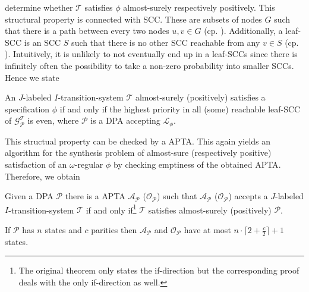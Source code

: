 determine whether $\mathcal{T}$ satisfies $\phi$ almost-surely respectively
positively. This structural property is connected with \ac{SCC}. These are
subsets of nodes $G$ such that there is a path between every two nodes
$u,v\in G$ (cp. \cite{Tarjan}). Additionally, a leaf-\ac{SCC} is an \ac{SCC}
$S$ such that there is no other \ac{SCC} reachable from any $v\in S$ (cp.
\cite[Bottom-\ac{SCC}]{ComplexProbVerification}). Intuitively, it is unlikely
to not eventually end up in a leaf-\acp{SCC} since there is infinitely often
the possibility to take a non-zero probability into smaller \acp{SCC}. Hence we
state
\begin{lemma}
  \cite[Lemma 1]{SynProbEnv}
  An $J$-labeled $I$-transition-system $\mathcal{T}$ almost-surely (positively)
  satisfies a specification $\phi$ if and only if the highest priority in all
  (some) reachable leaf-\ac{SCC} of $\mathcal{G}_{\mathcal{P}}^{\mathcal{T}}$
  is even, where $\mathcal{P}$ is a \ac{DPA} accepting $\mathcal{L}_{\phi}$.
  \label{lem:structuralprobability}
\end{lemma}
This structual property can be checked by a \ac{APTA}. This again yields an
algorithm for the synthesis problem of almost-sure (respectively positive)
satisfaction of an $\omega$-regular $\phi$ by checking emptiness of the
obtained \ac{APTA}. Therefore, we obtain
\begin{theorem}
  \cite[Theorem 1]{SynProbEnv}
  Given a \ac{DPA} $\mathcal{P}$ there is a \ac{APTA} 
  $\mathcal{A}_{\mathcal{P}}$ ($\mathcal{O}_{\mathcal{P}}$) such that 
  $\mathcal{A}_{\mathcal{P}}$ ($\mathcal{O}_{\mathcal{P}}$) accepts a 
  $J$-labeled $I$-transition-system $\mathcal{T}$ if and only 
  if\footnote{The original theorem only states the if-direction but the 
  corresponding proof deals with the only if-direction as well.} $\mathcal{T}$ 
  satisfies almost-surely (positively) $\mathcal{P}$.

  If $\mathcal{P}$ has $n$ states and $c$ parities then 
  $\mathcal{A}_{\mathcal{P}}$ and $\mathcal{O}_{\mathcal{P}}$ have at most
  $n\cdot\lceil 2 + \frac{c}{2}\rceil + 1$ states.
  \label{thm:probenvsynthesis}
\end{theorem}
